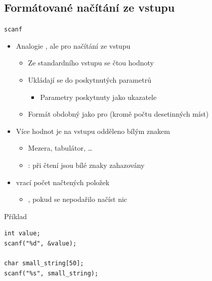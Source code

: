 \subsection*{Formátované načítání ze vstupu}
\frame{\subsectionpage}

\begin{frame}[fragile]{\texttt{scanf}}

  \begin{itemize}
    \item Analogie , ale pro načítání ze vstupu
    \begin{itemize}
      \item Ze standardního vstupu se čtou hodnoty

      \pause

      \item Ukládají se do poskytnutých parametrů
      \begin{itemize}
	\item Parametry poskytnuty jako ukazatele
      \end{itemize}

      \pause

      \item Formát obdobný jako pro  (kromě počtu desetinných míst)
    \end{itemize}

    \pause

    \item Více hodnot je na vstupu odděleno bílým znakem
    \begin{itemize}
      \item Mezera, tabulátor, \dots
      \item \pozor: při čtení jsou bílé znaky zahazovány
    \end{itemize}

    \pause

    \item {} vrací počet načtených položek
    \begin{itemize}
      \item {}, pokud se nepodařilo načíst nic
    \end{itemize}

  \end{itemize}

\begin{block}{Příklad}
\begin{lstlisting}
int value;
scanf("%d", &value);

char small_string[50];
scanf("%s", small_string);
\end{lstlisting}
\end{block}

\end{frame}

